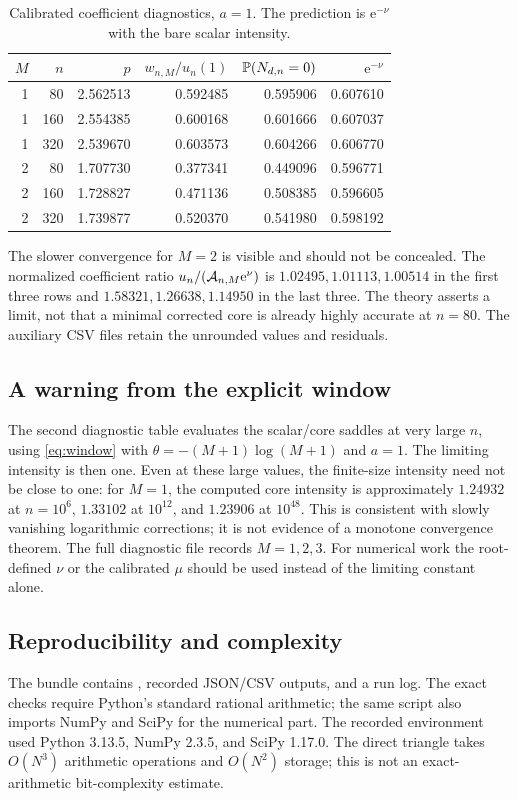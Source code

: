 \documentclass[11pt,a4paper]{article}
\numberwithin{equation}{section}
\theoremstyle{definition}
\theoremstyle{remark}
\newcommand{\ee}{\mathrm e}\newcommand{\dd}{\mathrm d}
\begin{document}
\begin{table}[htbp]
\centering\small
\caption{Calibrated coefficient diagnostics, $a=1$. The prediction is
$\ee^{-\nu}$ with the bare scalar intensity.}
\label{tab:diagnostics}
\begin{tabular}{rrrrrr}
\toprule
$M$&$n$&$p$&$w_{n,M}/u_n(1)$&$\mathbb P(N_{d,n}=0)$&$\ee^{-\nu}$\\
\midrule
1&80 &2.562513&0.592485&0.595906&0.607610\\
1&160&2.554385&0.600168&0.601666&0.607037\\
1&320&2.539670&0.603573&0.604266&0.606770\\
2&80 &1.707730&0.377341&0.449096&0.596771\\
2&160&1.728827&0.471136&0.508385&0.596605\\
2&320&1.739877&0.520370&0.541980&0.598192\\
\bottomrule
\end{tabular}
\end{table}

The slower convergence for $M=2$ is visible and should not be concealed.
The normalized coefficient ratio $u_n/(\Acal_{n,M}\ee^{\nu})$ is
$1.02495,1.01113,1.00514$ in the first three rows and
$1.58321,1.26638,1.14950$ in the last three. The theory asserts a limit,
not that a minimal corrected core is already highly accurate at $n=80$.
The auxiliary CSV files retain the unrounded values and residuals.

\subsection{A warning from the explicit window}
The second diagnostic table evaluates the scalar/core saddles at very large
$n$, using \eqref{eq:window} with
$\theta=-(M+1)\log(M+1)$ and $a=1$. The limiting intensity is then one.
Even at these large values, the finite-size intensity need not be close to
one: for $M=1$, the computed core intensity is approximately $1.24932$ at
$n=10^6$, $1.33102$ at $10^{12}$, and $1.23906$ at $10^{48}$.
This is consistent with slowly vanishing logarithmic corrections; it is not
evidence of a monotone convergence theorem. The full diagnostic file records
$M=1,2,3$. For numerical work the root-defined $\nu$ or the calibrated
$\mu$ should be used instead of the limiting constant alone.

\subsection{Reproducibility and complexity}
The bundle contains , recorded JSON/CSV outputs,
and a run log. The exact checks require Python's standard rational arithmetic;
the same script also imports NumPy and SciPy for the numerical part. The
recorded environment used Python 3.13.5, NumPy 2.3.5, and SciPy 1.17.0.
The direct triangle takes $O(N^3)$ arithmetic operations and $O(N^2)$
storage; this is not an exact-arithmetic bit-complexity estimate.
\end{document}
